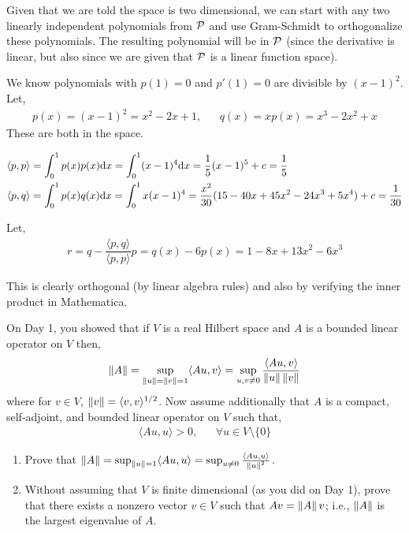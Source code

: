 \documentclass[10pt]{article}
\begin{document}
\begin{solution}[Solution]
Given that we are told the space is two dimensional, we can start with any two linearly independent polynomials from \( \mathcal{P} \) and use Gram-Schmidt to orthogonalize these polynomials. The resulting polynomial will be in \( \mathcal{P} \) (since the derivative is linear, but also since we are given that \( \mathcal{P} \) is a linear function space).

We know polynomials with \( p(1) = 0 \) and \( p'(1) = 0 \) are divisible by \( (x-1)^2 \). Let,
\begin{align*}
    p(x) = (x-1)^2 = x^2 - 2x + 1,&& q(x) = xp(x) = x^3-2x^2+x
\end{align*}
These are both in the space.

\begin{align*}
\langle p, p\rangle &= \int_0^1 p(x) p(x) \mathrm{d} x = \int_0^1 (x-1)^4\mathrm{d} x = \dfrac{1}{5}(x-1)^5 + c = \dfrac{1}{5} \\
\langle p,q \rangle &= \int_0^1 p(x) q(x) \mathrm{d} x = \int_0^1 x(x-1)^4 = \dfrac{x^2}{30}(15-40x+45x^2-24x^3+5x^4)  + c = \dfrac{1}{30}
\end{align*}

Let,
\begin{align*}
    r = q - \dfrac{\langle p,q\rangle }{ \langle p,p\rangle } p = q(x) - 6p(x) = 1-8x+13x^2-6x^3
\end{align*}

This is clearly orthogonal (by linear algebra rules) and also by verifying the inner product in Mathematica.

\end{solution}

\begin{problem}
On Day 1, you showed that if \( V \) is a real Hilbert space and \( A \) is a bounded linear operator on \( V \) then,
\begin{align*}
    \left\lVert A\right\rVert = \sup_{\left\lVert u\right\rVert = \left\lVert v\right\rVert = 1} \langle Au,v\rangle = \sup_{u,v\neq 0} \dfrac{\langle Au,v\rangle}{\left\lVert u\right\rVert\left\lVert v\right\rVert}
\end{align*}
where for \( v \in V \), \(\left\lVert v\right\rVert = \langle v,v\rangle^{1/2} \). Now assume additionally that \( A \) is a compact, self-adjoint, and bounded linear operator on \( V \) such that,
\begin{align*}
    \langle Au, u\rangle > 0, && \forall u\in V\setminus\{0\}
\end{align*}
\begin{enumerate}[label=(\alph*), nolistsep]
\item Prove that \( \left\lVert A\right\rVert =\sup_{\left\lVert u\right\rVert =1}\langle Au, u\rangle  = \sup_{u\neq 0} \frac{\langle Au,u\rangle}{\left\lVert u\right\rVert^2} \).
\item Without assuming that \( V \) is finite dimensional (as you did on Day 1), prove that there exists a nonzero vector \( v \in V \) such that \( Av = \left\lVert A\right\rVert v \); i.e., \( \left\lVert A\right\rVert \) is the largest eigenvalue of \( A \).

\end{enumerate}
\end{problem}
\end{document}
